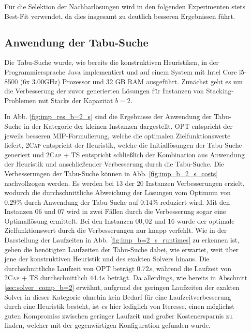 Für die Selektion der Nachbarlösungen wird in den folgenden Experimenten stets Best-Fit verwendet,
da dies insgesamt zu deutlich besseren Ergebnissen führt.

\subsection{Anwendung der Tabu-Suche}
\label{sec:tabu_search_experiments}

Die Tabu-Suche wurde, wie bereits die konstruktiven Heuristiken, in der Programmiersprache Java implementiert und
auf einem System mit Intel Core i5-8500 (6x 3.00GHz) Prozessor und 32 GB RAM ausgeführt.
Zunächst geht es um die Verbesserung der zuvor generierten Lösungen für Instanzen von Stacking-Problemen
mit Stacks der Kapazität $b = 2$.

In Abb. \ref{fig:imp_res_b=2_s} sind die Ergebnisse der Anwendung der Tabu-Suche in der Kategorie
der kleinen Instanzen dargestellt. \textsc{OPT} entspricht der jeweils besseren MIP-Formulierung, welche die optimalen Zielfunktionswerte liefert, \textsc{2Cap} entspricht der Heuristik, welche die Initiallösungen der Tabu-Suche generiert und \textsc{2Cap + TS} entspricht schließlich der Kombination aus Anwendung der Heuristik und anschließender Verbesserung durch die Tabu-Suche. Die Verbesserungen der Tabu-Suche können in Abb. \ref{fig:imp_b=2_s_costs} nachvollzogen werden. Es werden bei $13$ der $20$ Instanzen Verbesserungen erzielt, wodurch die durchschnittliche Abweichung der Lösungen vom Optimum von $0.29 \%$ durch Anwendung der Tabu-Suche
auf $0.14 \%$ reduziert wird. Mit den Instanzen $06$ und $07$ wird in zwei Fällen durch die Verbesserung sogar eine Optimallösung ermittelt. Bei den Instanzen $00, 02$ und $16$ wurde der optimale Zielfunktionswert durch die Verbesserungen nur knapp verfehlt. Wie in der Darstellung der Laufzeiten in Abb. \ref{fig:imp_b=2_s_runtimes} zu erkennen ist, gehen die benötigten Laufzeiten der Tabu-Suche dabei, wie erwartet, weit über jene der konstruktiven Heuristik und des exakten Solvers hinaus. Die durchschnittliche Laufzeit von \textsc{OPT} beträgt $0.72s$, während
die Laufzeit von \textsc{2Cap + TS} durchschnittlich $44.4s$ beträgt. Da allerdings, wie bereits in Abschnitt \ref{sec:solver_comp_b=2} erwähnt, aufgrund der geringen Laufzeiten der exakten Solver in dieser Kategorie ohnehin kein Bedarf für eine Laufzeitverbesserung durch eine Heuristik besteht, ist es hier lediglich von Iteresse, einen möglichst guten Kompromiss zwischen geringer Laufzeit und großer Kostenersparnis zu finden, welcher mit der gegenwärtigen Konfiguration gefunden wurde.

